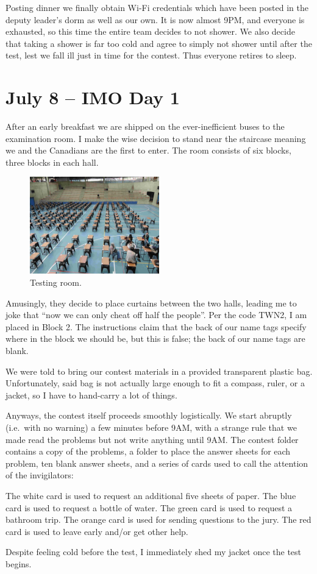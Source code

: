 \documentclass[11pt]{scrreprt}
\numberwithin{figure}{chapter}
\begin{document}
Posting dinner we finally obtain Wi-Fi credentials which have been posted in the deputy leader's dorm as well as our own.
It is now almost 9PM, and everyone is exhausted, so this time the entire team decides to not shower. We also decide that taking a shower
is far too cold and agree to simply not shower until after the test, lest we fall ill just in time for the contest.
Thus everyone retires to sleep.

\section{July 8 -- IMO Day 1}
After an early breakfast we are shipped on the ever-inefficient buses
to the examination room.
I make the wise decision to stand near the staircase meaning we and the Canadians are the first to enter.
The room consists of six blocks, three blocks in each hall.

\begin{figure}[ht]
  \centering
  \includegraphics[width=0.5\textwidth]{media/contest_venue.jpg}
  \caption{Testing room.}
\end{figure}

Amusingly, they decide to place curtains between the two halls, leading me to joke that ``now we can only cheat off half the people''.
Per the code TWN2, I am placed in Block 2. The instructions claim that the back of our name tags specify where in the block we should be, but this is false; the back of our name tags are blank.

We were told to bring our contest materials in a provided transparent plastic bag. Unfortunately, said bag is not actually large enough to fit a compass, ruler, or a jacket, so I have to hand-carry a lot of things.

Anyways, the contest itself proceeds smoothly logistically.
We start abruptly (i.e.\ with no warning) a few minutes before 9AM,
with a strange rule that we made read the problems but not write anything until 9AM.
The contest folder contains a copy of the problems, a folder to place the answer sheets for each problem, ten blank answer sheets, and a series of cards used to call the attention of the invigilators:
\begin{itemize}
  \ii The white card is used to request an additional five sheets of paper.
  \ii The blue card is used to request a bottle of water.
  \ii The green card is used to request a bathroom trip.
  \ii The orange card is used for sending questions to the jury.
  \ii The red card is used to leave early and/or get other help.
\end{itemize}
Despite feeling cold before the test, I immediately shed my jacket once the test begins.
\end{document}
